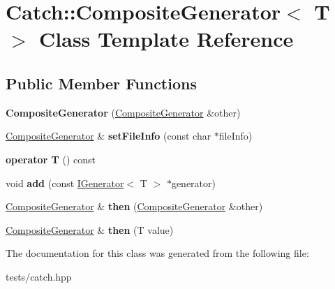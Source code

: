 \hypertarget{class_catch_1_1_composite_generator}{}\section{Catch\+:\+:Composite\+Generator$<$ T $>$ Class Template Reference}
\label{class_catch_1_1_composite_generator}
\subsection*{Public Member Functions}
\begin{DoxyCompactItemize}
\item 
\mbox{\label{class_catch_1_1_composite_generator_a21a7070a00e4a6fe021294c356692692}} 
{\bfseries Composite\+Generator} (\hyperlink{class_catch_1_1_composite_generator}{Composite\+Generator} \&other)
\item 
\mbox{\label{class_catch_1_1_composite_generator_ac3c57cf4ca5472f440bf71e2936bcd4a}} 
\hyperlink{class_catch_1_1_composite_generator}{Composite\+Generator} \& {\bfseries set\+File\+Info} (const char $\ast$file\+Info)
\item 
\mbox{\label{class_catch_1_1_composite_generator_a83d6c941e2e735b9528e6e832f7b76e7}} 
{\bfseries operator T} () const
\item 
\mbox{\label{class_catch_1_1_composite_generator_af3774d42ad2d3453d089ca599efe0517}} 
void {\bfseries add} (const \hyperlink{struct_catch_1_1_i_generator}{I\+Generator}$<$ T $>$ $\ast$generator)
\item 
\mbox{\label{class_catch_1_1_composite_generator_a2e03f42df85cdd238aabd77a80b075d5}} 
\hyperlink{class_catch_1_1_composite_generator}{Composite\+Generator} \& {\bfseries then} (\hyperlink{class_catch_1_1_composite_generator}{Composite\+Generator} \&other)
\item 
\mbox{\label{class_catch_1_1_composite_generator_aefdc11bcfccdf07d2db5f0da3ed8758c}} 
\hyperlink{class_catch_1_1_composite_generator}{Composite\+Generator} \& {\bfseries then} (T value)
\end{DoxyCompactItemize}


The documentation for this class was generated from the following file\+:\begin{DoxyCompactItemize}
\item 
tests/catch.\+hpp\end{DoxyCompactItemize}
